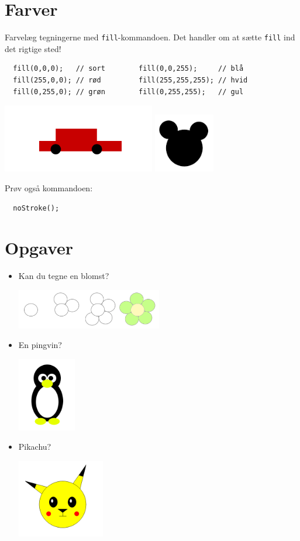 \documentclass[oneside,a4paper,10pts,article]{memoir}
\begin{document}
\newpage
\chapter{Farver}
Farvelæg tegningerne med \texttt{fill}-kommandoen. Det handler om at
sætte \texttt{fill} ind det rigtige sted!
\begin{lstlisting}
  fill(0,0,0);   // sort        fill(0,0,255);     // blå
  fill(255,0,0); // rød         fill(255,255,255); // hvid
  fill(0,255,0); // grøn        fill(0,255,255);   // gul
\end{lstlisting}
\vspace{-3mm}
\includegraphics[width=0.5\textwidth]{pics/bil-farvet.png}
\includegraphics[width=0.20\textwidth]{pics/mickey_simpel.png}

\noindent
Prøv også kommandoen:
\begin{lstlisting}
  noStroke();
\end{lstlisting}

\chapter{Opgaver}
\begin{itemize}
\item Kan du tegne en blomst?

  \includegraphics[width=0.5\textwidth]{pics/blomst.png}

\item En pingvin?

  \includegraphics[width=0.20\textwidth]{pics/pingvin.png}

\item Pikachu?

  \includegraphics[width=0.3\textwidth]{pics/pikachu.png}
\end{itemize}
\end{document}
